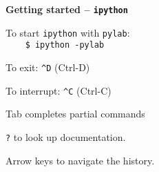 \textbf{Getting started -- \texttt{ipython}}

To start \lstinline|ipython| with \lstinline|pylab|:\\
\lstinline|    $ ipython -pylab| %

To exit: \lstinline|^D| (Ctrl-D)

To interrupt: \lstinline|^C| (Ctrl-C)

Tab completes partial commands

\texttt{?} to look up documentation. 

Arrow keys to navigate the history. 
